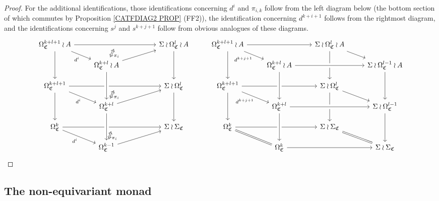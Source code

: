 \documentclass[a4paper,10pt
,draft
]{article}%
\numberwithin{equation}{section}
\numberwithin{figure}{section}
\theoremstyle{definition} %
\newcommand{\1}{\ensuremath{\mathbbm 1}}%
\begin{document}
\begin{proof}
For the additional identifications, 
those identifications concerning $d^i$ and $\pi_{i,k}$
follow from the left diagram below 
(the bottom section of which commutes by 
Proposition \ref{CATFDIAG2 PROP} (FF2)),
the identification concerning $d^{k+i+1}$ follows from the rightmost diagram, and the identifications concerning 
$s^j$ and $s^{k+j+1}$
follow from obvious analogues of these diagrams.
\[
\begin{tikzcd}[row sep = 10pt]
	\Omega^{k+l+1}_{\mathfrak{C}} \wr A \ar{rrr}[name=TT,swap]{} \ar{rd}[swap]{d^i} \ar{dd} &&&
	\Sigma \wr \Omega^{l}_{\mathfrak{C}} \wr A \ar{dd}
&
	\Omega^{k+l+1}_{\mathfrak{C}} \wr A \ar{rr} \ar{rd}[swap]{d^{k+j+1}} \ar{dd} &&
	\Sigma \wr \Omega^{l}_{\mathfrak{C}} \wr A \ar{rd} \ar{dd}
\\
	&
	|[alias=TD]|
	\Omega^{k+l}_{\mathfrak{C}} \wr A \ar{rru} &&
&
	&
	\Omega^{k+l}_{\mathfrak{C}} \wr A \arrow[rr, crossing over] &&
	\Sigma \wr \Omega^{l-1}_{\mathfrak{C}} \wr A 	 \ar{dd}
\\
	\Omega^{k+l+1}_{\mathfrak{C}} \ar{rrr}[name=MT,swap]{} \ar{rd}[swap]{d^i} \ar{dd} &&&
	\Sigma \wr \Omega^{l}_{\mathfrak{C}} \ar{dd}
&
	\Omega^{k+l+1}_{\mathfrak{C}} \ar{rr} \ar{rd}[swap]{d^{k+j+1}} \ar{dd}&&
	\Sigma \wr \Omega^{l}_{\mathfrak{C}} \ar{rd} \ar{dd}
\\
	&
	|[alias=MD]|
	\Omega^{k+l}_{\mathfrak{C}} \ar{rru} \arrow[uu, leftarrow, crossing over] &&
&
	&
	\Omega^{k+l}_{\mathfrak{C}} \arrow[rr, crossing over] \arrow[uu, leftarrow, crossing over] &&
	\Sigma \wr \Omega^{l-1}_{\mathfrak{C}} \ar{dd}
\\
	\Omega^{k}_{\mathfrak{C}} \ar{rrr}[name=DT,swap]{} \ar{rd}[swap]{d^i} &&&
	\Sigma \wr \Sigma_{\mathfrak{C}}
&
	\Omega^{k}_{\mathfrak{C}} \ar{rr} \ar[equal]{rd} &&
	\Sigma \wr \Sigma_{\mathfrak{C}} \ar[equal]{rd}
\\
	&
	|[alias=DD]|
	\Omega^{k-1}_{\mathfrak{C}} \ar{rru} \arrow[uu, leftarrow, crossing over] &&
&
	&
	\Omega^{k}_{\mathfrak{C}} \ar{rr} \arrow[uu, leftarrow, crossing over] &&
	\Sigma \wr \Sigma_{\mathfrak{C}} 
\arrow[Leftrightarrow, from=TT, to=TD,shorten >=0.05cm,shorten <=0.05cm,
"\pi_{i}"
]
\arrow[Leftrightarrow, from=MT, to=MD,shorten >=0.05cm,shorten <=0.05cm,
"\pi_{i}"
]
\arrow[Leftrightarrow, from=DT, to=DD,shorten >=0.05cm,shorten <=0.05cm,
"\pi_{i}"
]
\end{tikzcd}
\]
\end{proof}




\subsection{The non-equivariant monad} \label{NONEQMON SEC}
\end{document}
